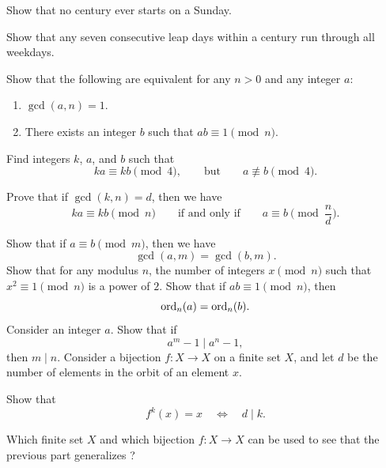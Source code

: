 \begin{routine}
  \exercise
  \begin{subexenum}
  \item Show that no century ever starts on a Sunday.
  \item Show that any seven consecutive leap days within a century run through all weekdays.
  \end{subexenum}
  \exercise Show that the following are equivalent for any $n>0$ and any integer $a$:
  \begin{enumerate}
  \item $\gcd(a,n)=1$.
  \item There exists an integer $b$ such that $ab\equiv 1\pmod{n}$.
  \end{enumerate}
  \exercise
  \begin{subexenum}
  \item Find integers $k$, $a$, and $b$ such that
    \begin{equation*}
      ka\equiv kb\pmod{4},\qquad\text{but}\qquad a\nequiv b\pmod{4}.
    \end{equation*}
  \item Prove that if $\gcd(k,n)=d$, then we have
    \begin{equation*}
      ka\equiv kb\pmod{n}\qquad\text{if and only if}\qquad a\equiv b\pmod{\frac{n}{d}}.
    \end{equation*}
  \end{subexenum}
  \exercise Show that if $a\equiv b\pmod{m}$, then we have
  \begin{equation*}
    \gcd(a,m)=\gcd(b,m).
  \end{equation*}
  \exercise Show that for any modulus $n$, the number of integers $x\pmod{n}$ such that $x^2\equiv 1\pmod{n}$ is a power of $2$.
  \exercise Show that if $ab\equiv 1\pmod{n}$, then
  \begin{equation*}
    \operatorname{ord}_n(a)=\operatorname{ord}_n(b).
  \end{equation*}
  \exercise Consider an integer $a$. Show that if
  \begin{equation*}
    a^m-1 \mid a^n-1,
  \end{equation*}
  then $m\mid n$.
  \exercise \label{exercise:orbit-order-theorem}Consider a bijection $f:X\to X$ on a finite set $X$, and let $d$ be the number of elements in the orbit of an element $x$.
  \begin{subexenum}
  \item Show that
    \begin{equation*}
      f^k(x)=x\quad\Leftrightarrow\quad d\mid k.
    \end{equation*}
  \item Which finite set $X$ and which bijection $f:X\to X$ can be used to see that the previous part generalizes ?
  \end{subexenum}
\end{routine}

